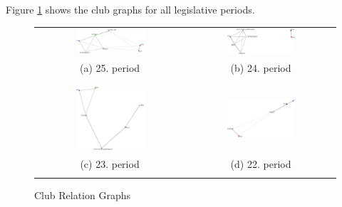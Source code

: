 Figure \ref{fig:all_club_graphs} shows the club graphs for all legislative periods.

\begin{figure}[h]
	\center
	\setlength{\tabcolsep}{.26667em}
	\begin{tabular}{ c | c }
		\includegraphics[width=0.48\textwidth]{imgs/graphs/club-graphs/horizontal/graph_25.eps}
		&
		\includegraphics[width=0.48\textwidth]{imgs/graphs/club-graphs/horizontal/graph_24.eps}
		\\
		(a) 25. period
		&
		(b) 24. period
		
		\\
		\\
		\hline
		\\
		\includegraphics[width=0.48\textwidth]{imgs/graphs/club-graphs/horizontal/graph_23.eps}
		&
		\includegraphics[width=0.48\textwidth]{imgs/graphs/club-graphs/horizontal/graph_22.eps}
		\\
		(c) 23. period
		&
		(d) 22. period
		\\
		\\
				
		
	\end{tabular}

	\caption{Club Relation Graphs}
	\label{fig:all_club_graphs}
\end{figure}


